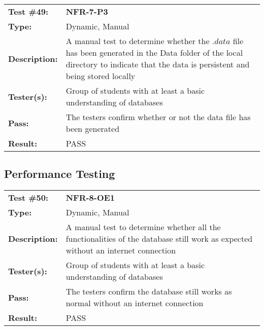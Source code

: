 \documentclass[12pt, titlepage]{article}
\begin{document}
\begin{mdframed}[linewidth=1pt]
\begin{tabularx}{\textwidth}{@{}p{3cm}X@{}}
{\bf Test \#49:} & {\bf NFR-7-P3}\\[\baselineskip]
{\bf Type:} & Dynamic, Manual \\[0.5\baselineskip]
{\bf Description:} & A manual test to determine whether the $.data$ file has been generated in the Data folder of the local directory to indicate that the data is persistent and being stored locally \\[\baselineskip]
{\bf Tester(s):} & Group of students with at least a basic understanding of databases \\[\baselineskip]
{\bf Pass:} & The testers confirm whether or not the data file has been generated \\[\baselineskip]
{\bf Result:} & PASS
\end{tabularx}
\end{mdframed}

\subsection{Performance Testing}

\begin{mdframed}[linewidth=1pt]
\begin{tabularx}{\textwidth}{@{}p{3cm}X@{}}
{\bf Test \#50:} & {\bf NFR-8-OE1}\\[\baselineskip]
{\bf Type:} & Dynamic, Manual \\[0.5\baselineskip]
{\bf Description:} & A manual test to determine whether all the functionalities of the database still work as expected without an internet connection  \\[\baselineskip]
{\bf Tester(s):} & Group of students with at least a basic understanding of databases \\[\baselineskip]
{\bf Pass:} & The testers confirm the database still works as normal without an internet connection \\[\baselineskip]
{\bf Result:} & PASS
\end{tabularx}
\end{mdframed}
\end{document}
